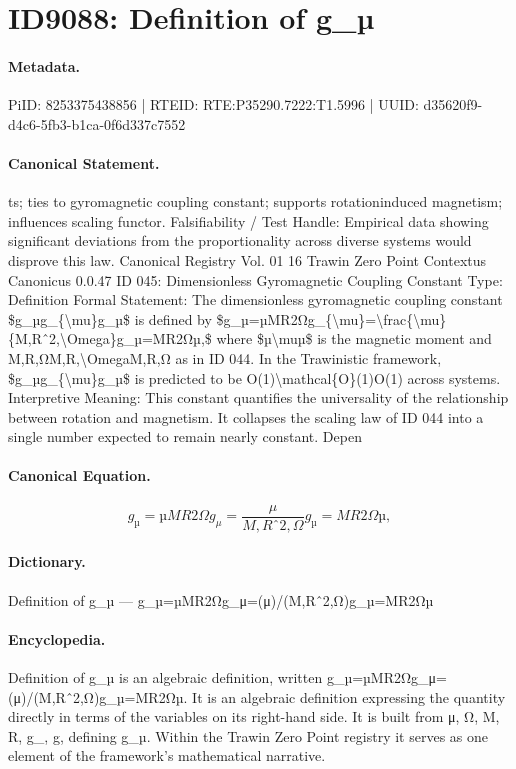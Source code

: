 \section*{ID9088: Definition of g\_µ}
\paragraph{Metadata.}
PiID: 8253375438856 | RTEID: RTE:P35290.7222:T1.5996 | UUID: d35620f9-d4c6-5fb3-b1ca-0f6d337c7552

\paragraph{Canonical Statement.}
ts; ties to gyromagnetic coupling constant; supports rotationinduced magnetism; influences scaling functor. Falsifiability / Test Handle: Empirical data showing significant deviations from the proportionality across diverse systems would disprove this law. Canonical Registry Vol. 01 16 Trawin Zero Point Contextus Canonicus 0.0.47 ID 045: Dimensionless Gyromagnetic Coupling Constant Type: Definition Formal Statement: The dimensionless gyromagnetic coupling constant \$g\_µg\_\{\textbackslash{}mu\}g\_µ\$ is defined by \$g\_µ=µMR2Ωg\_\{\textbackslash{}mu\}=\textbackslash{}frac\{\textbackslash{}mu\}\{M,Rˆ2,\textbackslash{}Omega\}g\_µ=MR2Ωµ,\$ where \$µ\textbackslash{}muµ\$ is the magnetic moment and M,R,ΩM,R,\textbackslash{}OmegaM,R,Ω as in ID 044. In the Trawinistic framework, \$g\_µg\_\{\textbackslash{}mu\}g\_µ\$ is predicted to be O(1)\textbackslash{}mathcal\{O\}(1)O(1) across systems. Interpretive Meaning: This constant quantifies the universality of the relationship between rotation and magnetism. It collapses the scaling law of ID 044 into a single number expected to remain nearly constant. Depen

\paragraph{Canonical Equation.}
\[
g_µ=µMR2Ωg_{\mu}=\frac{\mu}{M,Rˆ2,\Omega}g_µ=MR2Ωµ,
\]

\paragraph{Dictionary.}
Definition of g\_µ — g\_µ=µMR2Ωg\_μ=(μ)/(M,Rˆ2,Ω)g\_µ=MR2Ωµ

\paragraph{Encyclopedia.}
Definition of g\_µ is an algebraic definition, written g\_µ=µMR2Ωg\_μ=(μ)/(M,Rˆ2,Ω)g\_µ=MR2Ωµ. It is an algebraic definition expressing the quantity directly in terms of the variables on its right-hand side. It is built from μ, Ω, M, R, g\_, g, defining g\_µ. Within the Trawin Zero Point registry it serves as one element of the framework's mathematical narrative.

